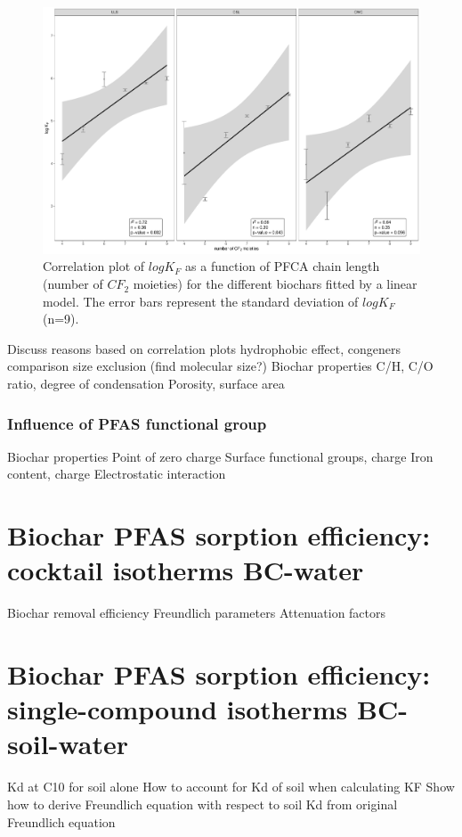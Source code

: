 \begin{figure}
    \centering
    \includegraphics[width=\textwidth]{R/figs/chainlength_KF.pdf}
    \caption{Correlation plot of $log K_F$ as a function of PFCA chain length (number of $CF_2$ moieties) for the different biochars fitted by a linear model. The error bars represent the standard deviation of $log K_F$ (n=9).}
    \label{fig:chainlength}
\end{figure}
 
Discuss reasons based on correlation plots
    hydrophobic effect, congeners comparison
    size exclusion (find molecular size?)
    Biochar properties
        C/H, C/O ratio, degree of condensation
        Porosity, surface area

\subsubsection{Influence of PFAS functional group}
Biochar properties
    Point of zero charge
    Surface functional groups, charge
    Iron content, charge
    Electrostatic interaction

\section{Biochar PFAS sorption efficiency: cocktail isotherms BC-water}
Biochar removal efficiency 
Freundlich parameters
Attenuation factors

\section{Biochar PFAS sorption efficiency: single-compound isotherms BC-soil-water}
Kd at C10 for soil alone
How to account for Kd of soil when calculating KF 
    Show how to derive Freundlich equation with respect to soil Kd from original Freundlich equation
    
